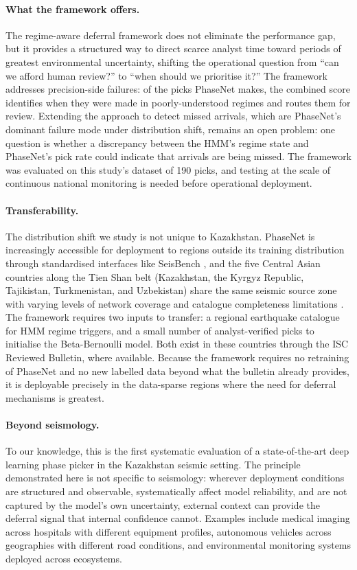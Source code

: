 \paragraph{What the framework offers.} The regime-aware deferral framework does not eliminate the performance gap, but it provides a structured way to direct scarce analyst time toward periods of greatest environmental uncertainty, shifting the operational question from ``can we afford human review?'' to ``when should we prioritise it?'' The framework addresses precision-side failures: of the picks PhaseNet makes, the combined score identifies when they were made in poorly-understood regimes and routes them for review. Extending the approach to detect missed arrivals, which are PhaseNet's dominant failure mode under distribution shift, remains an open problem: one question is whether a discrepancy between the HMM's regime state and PhaseNet's pick rate could indicate that arrivals are being missed. The framework was evaluated on this study's dataset of 190 picks, and testing at the scale of continuous national monitoring is needed before operational deployment.

\paragraph{Transferability.} The distribution shift we study is not unique to Kazakhstan. PhaseNet is increasingly accessible for deployment to regions outside its training distribution through standardised interfaces like SeisBench \citep{woollam2022seisbench}, and the five Central Asian countries along the Tien Shan belt (Kazakhstan, the Kyrgyz Republic, Tajikistan, Turkmenistan, and Uzbekistan) share the same seismic source zone with varying levels of network coverage and catalogue completeness limitations \citep{poggi2024harmonizing}. The framework requires two inputs to transfer: a regional earthquake catalogue for HMM regime triggers, and a small number of analyst-verified picks to initialise the Beta-Bernoulli model. Both exist in these countries through the ISC Reviewed Bulletin, where available. Because the framework requires no retraining of PhaseNet and no new labelled data beyond what the bulletin already provides, it is deployable precisely in the data-sparse regions where the need for deferral mechanisms is greatest.

\paragraph{Beyond seismology.} To our knowledge, this is the first systematic evaluation of a state-of-the-art deep learning phase picker in the Kazakhstan seismic setting. The principle demonstrated here is not specific to seismology: wherever deployment conditions are structured and observable, systematically affect model reliability, and are not captured by the model's own uncertainty, external context can provide the deferral signal that internal confidence cannot. Examples include medical imaging across hospitals with different equipment profiles, autonomous vehicles across geographies with different road conditions, and environmental monitoring systems deployed across ecosystems.
